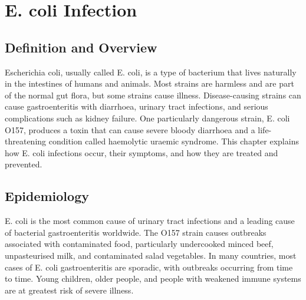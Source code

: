 \chapter{E. coli Infection}

\section*{Definition and Overview}
Escherichia coli, usually called E. coli, is a type of bacterium that lives naturally in the intestines of humans and animals. Most strains are harmless and are part of the normal gut flora, but some strains cause illness. Disease-causing strains can cause gastroenteritis with diarrhoea, urinary tract infections, and serious complications such as kidney failure. One particularly dangerous strain, E. coli O157, produces a toxin that can cause severe bloody diarrhoea and a life-threatening condition called haemolytic uraemic syndrome. This chapter explains how E. coli infections occur, their symptoms, and how they are treated and prevented.

\section*{Epidemiology}
E. coli is the most common cause of urinary tract infections and a leading cause of bacterial gastroenteritis worldwide. The O157 strain causes outbreaks associated with contaminated food, particularly undercooked minced beef, unpasteurised milk, and contaminated salad vegetables. In many countries, most cases of E. coli gastroenteritis are sporadic, with outbreaks occurring from time to time. Young children, older people, and people with weakened immune systems are at greatest risk of severe illness.

